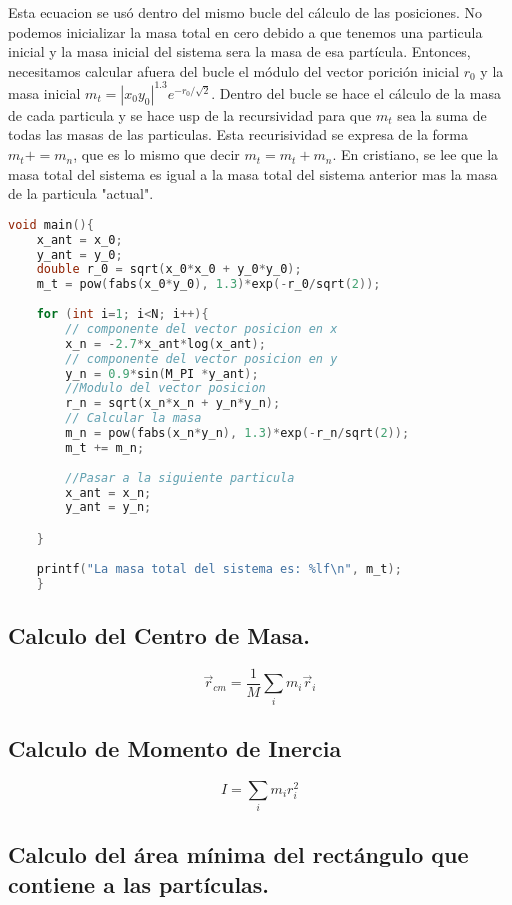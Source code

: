 \documentclass[12pt]{article}
\begin{document}
Esta ecuacion se usó dentro del mismo bucle del cálculo de las posiciones. No podemos inicializar la masa total en cero debido a que tenemos una particula inicial y la masa inicial del sistema sera la masa de esa partícula.
Entonces, necesitamos calcular afuera del bucle el módulo del vector porición inicial $r_0$ y la masa inicial $m_t = |x_0 y_0|^{1.3} e^{-r_0 / \sqrt{2}}$. Dentro del bucle se hace el cálculo de la masa de cada particula y se hace usp de la recursividad para que $m_t$ sea la suma de todas las masas de las particulas. Esta recurisividad se expresa de la forma $m_t += m_n$, que es lo mismo que decir $m_t = m_t + m_n$. En cristiano, se lee que la masa total del sistema es igual a la masa total del sistema anterior mas la masa de la particula "actual".
\begin{lstlisting}[language=C, caption={Calculo de la masa.}, style=mystyle]
    void main(){
    x_ant = x_0;
    y_ant = y_0;
    double r_0 = sqrt(x_0*x_0 + y_0*y_0);
    m_t = pow(fabs(x_0*y_0), 1.3)*exp(-r_0/sqrt(2));
    
    for (int i=1; i<N; i++){
        // componente del vector posicion en x
        x_n = -2.7*x_ant*log(x_ant);
        // componente del vector posicion en y
        y_n = 0.9*sin(M_PI *y_ant);
        //Modulo del vector posicion
        r_n = sqrt(x_n*x_n + y_n*y_n);
        // Calcular la masa
        m_n = pow(fabs(x_n*y_n), 1.3)*exp(-r_n/sqrt(2));
        m_t += m_n;
        
        //Pasar a la siguiente particula
        x_ant = x_n;
        y_ant = y_n;

    }
    
    printf("La masa total del sistema es: %lf\n", m_t);   
    }

    \end{lstlisting}

\subsection{Calculo del Centro de Masa.}

\begin{equation}
    \label{rcm}
    \Vec{r}_{cm} = \frac{1}{M} \sum_i m_i \vec{r}_i
\end{equation}

\subsection{Calculo de Momento de Inercia}

\begin{equation}
    \label{Inercia}
    I =  \sum_i m_i r^{2}_{i}
\end{equation}

\subsection{Calculo del área mínima del rectángulo que contiene a las partículas.}

 
\end{document}
